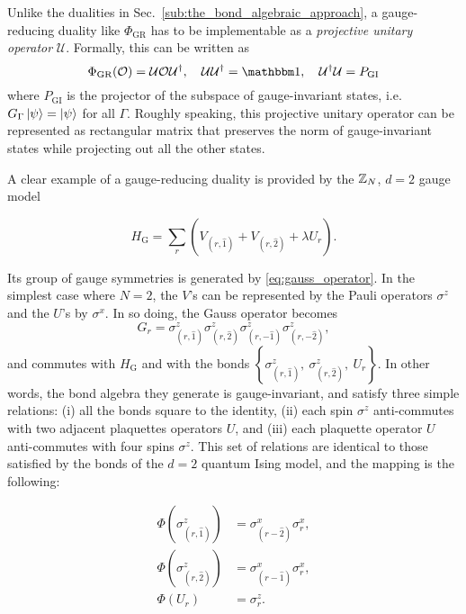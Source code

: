 Unlike the dualities in Sec.~\ref{sub:the_bond_algebraic_approach}, a gauge-reducing duality like $\Phi_{\text{GR}}$ has to be implementable as a \emph{projective unitary operator} $\mathcal{U}$.
Formally, this can be written as
\begin{equation}
    \Phi_{\text{GR}} ( \mathcal{O} ) = \mathcal{U} \mathcal{O} \mathcal{U}^\dagger, \quad
    \mathcal{U} \mathcal{U}^\dagger = \identity, \quad
    \mathcal{U}^\dagger \mathcal{U} = P_{\text{GI}}
\end{equation}
where $P_{\text{GI}}$ is the projector of the subspace of gauge-invariant states, i.e.~$G_{\Gamma} \ket{\psi} = \ket{\psi}$ for all $\Gamma$.
Roughly speaking, this projective unitary operator can be represented as rectangular matrix that preserves the norm of gauge-invariant states while projecting out all the other states.

A clear example of a gauge-reducing duality is provided by the $\mathbb{Z}_N$, $d=2$ gauge model

\begin{equation}
	H_{\text{G}} = \sum_r \left( V_{(r,\hat{1})} + V_{(r,\hat{2})} + \lambda U_r \right).
\end{equation}

Its group of gauge symmetries is generated by \eqref{eq:gauss_operator}. In the simplest case where $N=2$, the $V$'s can be represented by the Pauli operators $\sigma^z$ and the $U$'s by $\sigma^x$. In so doing, the Gauss operator becomes
\begin{equation}
	G_r =
	\sigma^z_{(r, \hat{1})}
	\sigma^z_{(r, \hat{2})}
	\sigma^z_{(r, -\hat{1})}
	\sigma^z_{(r, -\hat{2})},
	\label{eq:gauss_operator_Z2}
\end{equation}
and commutes with $H_{\text{G}}$ and with the bonds $\left\{\sigma^z_{(r,\hat{1})},\ \sigma^z_{(r,\hat{2})},\ U_r\right\} $.
In other words, the bond algebra they generate is gauge-invariant, and satisfy three simple relations: (i) all the bonds square to the identity, (ii) each spin $\sigma^z$ anti-commutes with two adjacent plaquettes operators $U$, and (iii) each plaquette operator $U$ anti-commutes with four spins $\sigma^z$.
This set of relations are identical to those satisfied by the bonds of the $d=2$ quantum Ising model, and the mapping is the following:

\begin{equation}
    \begin{split}
        \Phi\left( \sigma^z_{(r,\hat{1})} \right) & = \sigma^x_{(r-\hat{2})} \sigma^x_r, \\
        \Phi\left( \sigma^z_{(r,\hat{2})} \right) & = \sigma^x_{(r-\hat{1})} \sigma^x_r, \\
        \Phi(U_r) & = \sigma^z_r.
    \end{split}
    \label{eq:duality_2d}
\end{equation}

